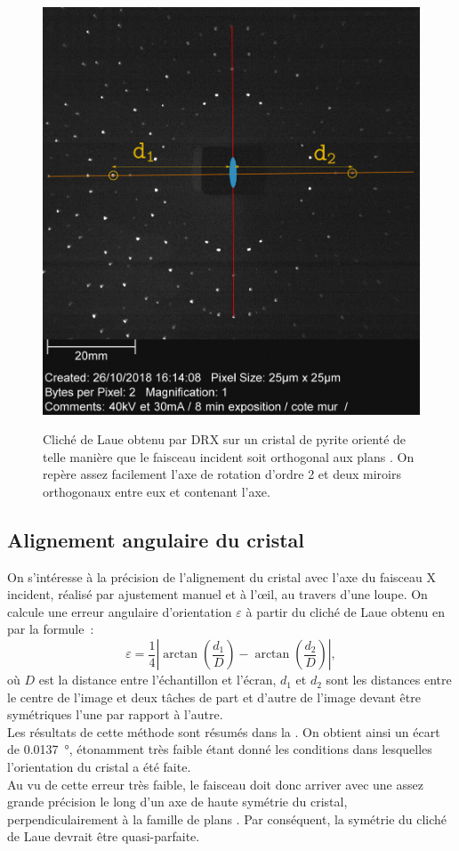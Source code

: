 \begin{figure}
\caption{Cliché de Laue obtenu par DRX sur un cristal de pyrite orienté de telle manière que le faisceau incident soit orthogonal aux plans . On repère assez facilement l'axe de rotation d'ordre 2 et deux miroirs orthogonaux entre eux et contenant l'axe.}
\includegraphics[width=0.85\columnwidth]{figures/Laue_Pyrite_3_symetries}
\label{fig:laueCliche}
\end{figure}

\subsection{Alignement angulaire du cristal}

On s'intéresse à la précision de l'alignement du cristal avec l'axe du faisceau X incident, réalisé par ajustement manuel et à l'œil, au travers d'une loupe.
On calcule une erreur angulaire d'orientation \(\varepsilon\) à partir du cliché de Laue obtenu en  par la formule~:
\begin{equation}
\varepsilon = \frac{1}{4} \left| \arctan\left( \frac{d_1}{D} \right) - \arctan\left(\frac{d_2}{D}\right) \right|,
\end{equation}
où \(D\) est la distance entre l'échantillon et l'écran, \(d_1\) et \(d_2\) sont les distances entre le centre de l'image et deux tâches de part et d'autre de l'image devant être symétriques l'une par rapport à l'autre.\\
Les résultats de cette méthode sont résumés dans la .
On obtient ainsi un écart de \SI{0.0137}{\degree}, étonamment très faible étant donné les conditions dans lesquelles l'orientation du cristal a été faite.\\
Au vu de cette erreur très faible, le faisceau doit donc arriver avec une assez grande précision le long d'un axe de haute symétrie du cristal, perpendiculairement à la famille de plans . Par conséquent, la symétrie du cliché de Laue devrait être quasi-parfaite.

